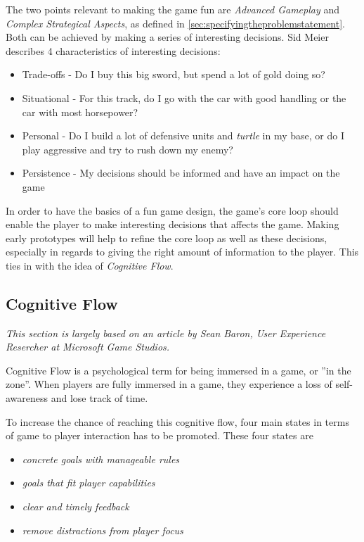 The two points relevant to making the game fun are \textit{Advanced Gameplay} and \textit{Complex Strategical Aspects}, as defined in \ref{sec:specifyingtheproblemstatement}.
Both can be achieved by making a series of interesting decisions.
Sid Meier describes 4 characteristics of interesting decisions: 
\begin{itemize}
	\item Trade-offs - Do I buy this big sword, but spend a lot of gold doing so?
	\item Situational - For this track, do I go with the car with good handling or the car with most horsepower?
	\item Personal - Do I build a lot of defensive units and \textit{turtle} in my base, or do I play aggressive and try to rush down my enemy?
	\item Persistence - My decisions should be informed and have an impact on the game
\end{itemize}

In order to have the basics of a fun game design, the game's core loop should enable the player to make interesting decisions that affects the game.
Making early prototypes will help to refine the core loop as well as these decisions, especially in regards to giving the right amount of information to the player.
This ties in with the idea of \textit{Cognitive Flow}.

\subsection{Cognitive Flow}
\emph{This section is largely based on an article by Sean Baron, User Experience Resercher at Microsoft Game
Studios\cite{baron}.}

Cognitive Flow is a psychological term for being immersed in a game, or ''in the zone''.
When players are fully immersed in a game, they experience a loss of self-awareness and lose track of time.

To increase the chance of reaching this cognitive flow, four main states in terms of game to player interaction has to
be promoted.  These four states are 
\begin{itemize}
    \item \emph{concrete goals with manageable rules}
    \item \emph{goals that fit player capabilities}
    \item \emph{clear and timely feedback}
    \item \emph{remove distractions from player focus}
\end{itemize}


